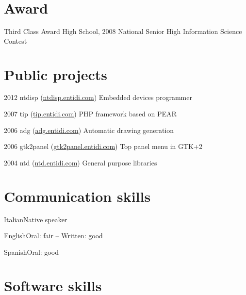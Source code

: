 \documentclass{tccv}
\begin{document}
\section{Award}

\begin{yearlist}

\item[Third Class Award]{High School, 2008}
     {National Senior High Information Science Contest}
     {}

\end{yearlist}


\section{Public projects}

\begin{yearlist}

\item{2012}
     {ntdisp (\href{http://ntdisp.entidi.com/}{ntdisp.entidi.com})}
     {Embedded devices programmer}

\item{2007}
     {tip (\href{http://tip.entidi.com/}{tip.entidi.com})}
     {PHP framework based on PEAR}

\item{2006}
     {adg (\href{http://adg.entidi.com/}{adg.entidi.com})}
     {Automatic drawing generation}

\item{2006}
     {gtk2panel (\href{http://gtk2panel.entidi.com/}{gtk2panel.entidi.com})}
     {Top panel menu in GTK+2}

\item{2004}
     {ntd (\href{http://ntd.entidi.com/}{ntd.entidi.com})}
     {General purpose libraries}

\end{yearlist}

\section{Communication skills}

\begin{factlist}
\item{Italian}{Native speaker}
\item{English}{Oral: fair -- Written: good}
\item{Spanish}{Oral: good}
\end{factlist}

\section{Software skills}
\end{document}
